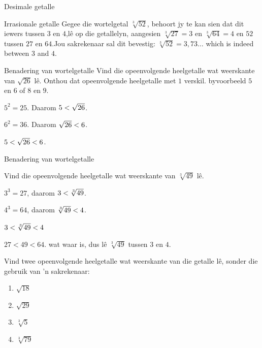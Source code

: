 \begin{Aktiwiteit}{Desimale getalle}
\begin{aktiwiteit}{Irrasionale getalle}
Gegee die wortelgetal $\sqrt[3]{52}$, behoort jy te kan sien dat dit iewers tussen $3$ en $4$,lê op die getallelyn, aangesien $\sqrt[3]{27}=3$ en $\sqrt[3]{64}=4$ en $52$ tussen $27$ en $64$.Jou sakrekenaar sal dit bevestig: $\sqrt[3]{52}=3,73\ldots$ which is indeed between $3$ and $4$.\par 

\begin{wex}{Benadering van wortelgetalle}
{
Vind die opeenvolgende heelgetalle wat weerskante van $\sqrt{26}$ lê.
Onthou dat opeenvolgende heelgetalle met $1$ verskil. byvoorbeeld $5$ en $6$ of $8$ en $9$.
}
{
           
${5}^{2}=25$. Daarom $5<{}\sqrt{26}$.

${6}^{2}=36$. 
Daarom $\sqrt{26}<{}6$.

$5<{}\sqrt{26}<{}6$. 
}
\end{wex}


\begin{wex}{Benadering van wortelgetalle }{

Vind die opeenvolgende heelgetalle wat weerskante van $\sqrt[3]{49}$ lê.
}
{
   ${3}^{3}=27$, daarom $3<{}\sqrt[3]{49}$.

 ${4}^{3}=64$, daarom $\sqrt[3]{49}<{}4$. 

$3<{}\sqrt[3]{49}<{}4$

$27<49<64$. wat waar is, dus lê $\sqrt[3]{49}$ tussen $3$ en $4$.
}
\end{wex}

\begin{exercises}{}
 {
Vind twee opeenvolgende heelgetalle wat weerskante van die getalle lê, sonder die gebruik van 'n sakrekenaar:
\begin{enumerate}[itemsep=5pt, label=\textbf{\arabic*}. ]
\item $\sqrt{18}$
\item $\sqrt{29}$
\item $\sqrt[3]{5}$
\item $\sqrt[3]{79}$


\end{enumerate}}
\end{exercises}
\end{aktiwiteit}
\end{Aktiwiteit}
